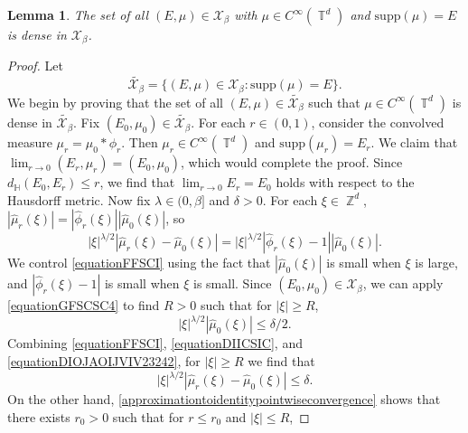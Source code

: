 \documentclass[dvipsnames,letterpaper,12pt]{article}
\numberwithin{equation}{section}
\DeclareMathOperator{\ZZ}{\mathbb{Z}}
\DeclareMathOperator{\TT}{\mathbb{T}}
\newtheorem{lemma}[theorem]{Lemma}
\numberwithin{theorem}{section}
\begin{document}
\begin{lemma} \label{smoothdensitylemma}
    The set of all $(E,\mu) \in \mathcal{X}_\beta$ with $\mu \in C^\infty(\TT^d)$ and $\text{supp}(\mu) = E$ is dense in $\mathcal{X}_\beta$.
\end{lemma}
\begin{proof}
    Let 
    \begin{equation}
        \tilde{\mathcal{X}_\beta} = \{ (E,\mu) \in \mathcal{X}_\beta : \text{supp}(\mu) = E \}.
    \end{equation}
    We begin by proving that the set of all $(E,\mu) \in \tilde{\mathcal{X}_\beta}$ such that $\mu \in C^\infty(\TT^d)$ is dense in $\tilde{\mathcal{X}_\beta}$. Fix $(E_0,\mu_0) \in \tilde{\mathcal{X}_\beta}$. For each $r \in (0,1)$, consider the convolved measure $\mu_r = \mu_0 * \phi_r$. Then $\mu_r \in C^\infty(\TT^d)$ and $\text{supp}(\mu_r) = E_r$. We claim that $\lim_{r \to 0} (E_r,\mu_r) = (E_0,\mu_0)$, which would complete the proof. Since $d_{\mathbb{H}}(E_0,E_r) \leq r$, we find that $\lim_{r \to 0} E_r = E_0$ holds with respect to the Hausdorff metric. Now fix $\lambda \in (0,\beta]$ and $\delta > 0$. For each $\xi \in \ZZ^d$, $|\widehat{\mu}_r(\xi)| = |\widehat{\phi}_r(\xi)| |\widehat{\mu}_0(\xi)|$, so
    \begin{equation} \label{equationFFSCI}
        |\xi|^{\lambda/2} |\widehat{\mu}_r(\xi) - \widehat{\mu}_0(\xi)| = |\xi|^{\lambda/2} |\widehat{\phi}_r(\xi) - 1| |\widehat{\mu}_0(\xi)|.
    \end{equation}
    We control \eqref{equationFFSCI} using the fact that $|\widehat{\mu}_0(\xi)|$ is small when $\xi$ is large, and $|\widehat{\phi}_r(\xi) - 1|$ is small when $\xi$ is small. Since $(E_0,\mu_0) \in \mathcal{X}_\beta$, we can apply \eqref{equationGFSCSC4} to find $R > 0$ such that for $|\xi| \geq R$,
    \begin{equation} \label{equationDIICSIC}
        |\xi|^{\lambda/2} |\widehat{\mu}_0(\xi)| \leq \delta/2.
    \end{equation}
    Combining \eqref{equationFFSCI}, \eqref{equationDIICSIC}, and \eqref{equationDIOJAOIJVIV23242}, for $|\xi| \geq R$ we find that
    \begin{equation} \label{equationDSCISIIXX}
        |\xi|^{\lambda/2} |\widehat{\mu}_r(\xi) - \widehat{\mu}_0(\xi)| \leq \delta.
    \end{equation}
    On the other hand, \eqref{approximationtoidentitypointwiseconvergence} shows that there exists $r_0 > 0$ such that for $r \leq r_0$ and $|\xi| \leq R$,

\end{proof}
\end{document}

